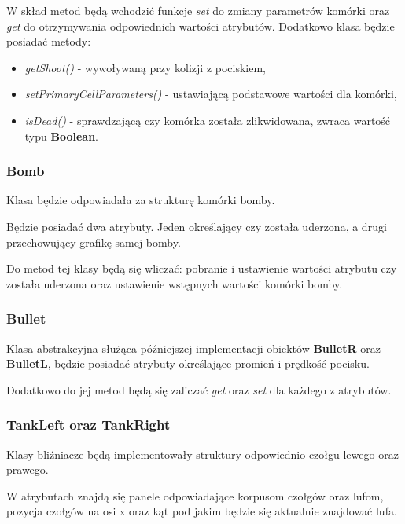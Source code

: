 \documentclass[a4paper]{article}
\begin{document}
W sk\l{}ad metod b\k{e}d\k{a} wchodzi\'c funkcje \textit{set} do zmiany parametr\'ow kom\'orki oraz \textit{get} do otrzymywania odpowiednich warto\'sci atrybut\'ow. 
Dodatkowo klasa b\k{e}dzie posiada\'c metody:
\begin{itemize}
    \item \textit{getShoot()} - wywo\l{}ywan\k{a} przy kolizji z pociskiem,
    \item \textit{setPrimaryCellParameters()} - ustawiaj\k{a}c\k{a} podstawowe warto\'sci dla kom\'orki,
    \item \textit{isDead()} - sprawdzaj\k{a}c\k{a} czy kom\'orka zosta\l{}a zlikwidowana, zwraca warto\'s\'c typu \textbf{Boolean}.
\end{itemize}

\subsubsection{Bomb}

\quad Klasa b\k{e}dzie odpowiada\l{}a za struktur\k{e} kom\'orki bomby.

B\k{e}dzie posiada\'c dwa atrybuty. Jeden okre\'slaj\k{a}cy czy zosta\l{}a uderzona, a drugi przechowuj\k{a}cy grafik\k{e} samej bomby.

Do metod tej klasy b\k{e}d\k{a} si\k{e} wlicza\'c: pobranie i ustawienie warto\'sci atrybutu czy zosta\l{}a uderzona oraz ustawienie wst\k{e}pnych warto\'sci kom\'orki bomby.

\subsubsection{Bullet}

\quad Klasa abstrakcyjna s\l{}u\.z\k{a}ca p\'o\'zniejszej implementacji obiekt\'ow \textbf{BulletR} oraz \textbf{BulletL}, b\k{e}dzie posiada\'c atrybuty okre\'slaj\k{a}ce promie\'n i pr\k{e}dko\'s\'c pocisku.

Dodatkowo do jej metod b\k{e}d\k{a} si\k{e} zalicza\'c \textit{get} oraz \textit{set} dla ka\.zdego z atrybut\'ow.


\subsubsection{TankLeft oraz TankRight}

\quad Klasy bli\'zniacze b\k{e}d\k{a} implementowa\l{}y struktury odpowiednio czo\l{}gu lewego oraz prawego. 

W atrybutach znajd\k{a} si\k{e} panele odpowiadaj\k{a}ce korpusom czo\l{}g\'ow oraz lufom, pozycja czo\l{}g\'ow na osi x oraz k\k{a}t pod jakim b\k{e}dzie si\k{e} aktualnie znajdowa\'c lufa.
\end{document}
